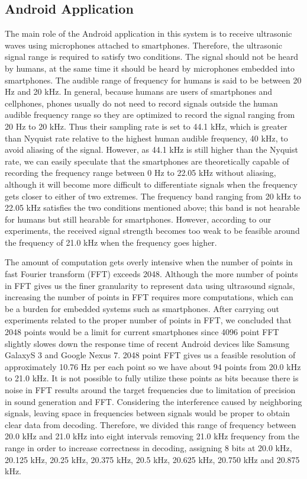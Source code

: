 \subsection{Android Application}
\label{sec:android-application}

The main role of the Android application in this system is to receive ultrasonic waves using microphones attached to smartphones. Therefore, the ultrasonic signal range is required to satisfy two conditions. The signal should not be heard by humans, at the same time it should be heard by microphones embedded into smartphones. The audible range of frequency for humans is said to be between 20 Hz and 20 kHz. In general, because humans are users of smartphones and cellphones, phones usually do not need to record signals outside the human audible frequency range so they are optimized to record the signal ranging from 20 Hz to 20 kHz. Thus their sampling rate is set to 44.1 kHz, which is greater than Nyquist rate relative to the highest human audible frequency, 40 kHz, to avoid aliasing of the signal. However, as 44.1 kHz is still higher than the Nyquist rate, we can easily speculate that the smartphones are theoretically capable of recording the frequency range between 0 Hz to 22.05 kHz without aliasing, although it will become more difficult to differentiate signals when the frequency gets closer to either of two extremes. The frequency band ranging from 20 kHz to 22.05 kHz satisfies the two conditions mentioned above; this band is not hearable for humans but still hearable for smartphones. However, according to our experiments, the received signal strength becomes too weak to be feasible around the frequency of 21.0 kHz when the frequency goes higher.

The amount of computation gets overly intensive when the number of points in fast Fourier transform (FFT) exceeds 2048. Although the more number of points in FFT gives us the finer granularity to represent data using ultrasound signals, increasing the number of points in FFT requires more computations, which can be a burden for embedded systems such as smartphones. After carrying out experiments related to the proper number of points in FFT, we concluded that 2048 points would be a limit for current smartphones since 4096 point FFT slightly slowes down the response time of recent Android devices like Samsung GalaxyS 3 and Google Nexus 7. 2048 point FFT gives us a feasible resolution of approximately 10.76 Hz per each point so we have about 94 points from 20.0 kHz to 21.0 kHz. It is not possible to fully utilize these points as bits because there is noise in FFT results around the target frequencies due to limitation of precision in sound generation and FFT. Considering the interference caused by neighboring signals, leaving space in frequencies between signals would be proper to obtain clear data from decoding. Therefore, we divided this range of frequency between 20.0 kHz and 21.0 kHz into eight intervals removing 21.0 kHz frequency from the range in order to increase correctness in decoding, assigning 8 bits at 20.0 kHz, 20.125 kHz, 20.25 kHz, 20.375 kHz, 20.5 kHz, 20.625 kHz, 20.750 kHz and 20.875 kHz.

